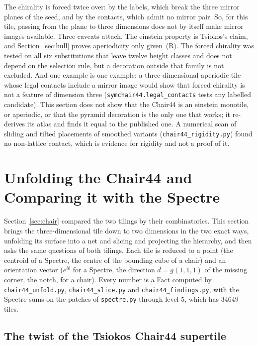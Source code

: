 \documentclass[11pt]{article}
\theoremstyle{definition}
\theoremstyle{remark}
\newcommand{\code}[1]{\texttt{#1}}
\begin{document}
\noindent
The chirality is forced twice over: by the labels, which break the three mirror planes of the seed, and by the contacts, which
admit no mirror pair.  So, for this tile, passing from the plane to three dimensions does not by itself make mirror images
available.  Three caveats attach.  The einstein property is Tsiokos's claim, and Section~\ref{sec:hull} proves aperiodicity only
given~(R).  The forced chirality was tested on
all six substitutions that leave twelve height classes and does not depend on the selection rule, but a decoration outside that
family is not excluded.  And one example is one example: a three-dimensional aperiodic tile whose legal contacts include a mirror
image would show that forced chirality is not a feature of dimension three (\code{symchair44.legal\_contacts} tests any labelled
candidate).  This section does not show that the Chair44 is an einstein monotile, or aperiodic, or that the pyramid decoration
is the only one that works; it re-derives its atlas and finds it equal to the published one.  A numerical scan of sliding and
tilted placements of smoothed variants (\code{chair44\_rigidity.py}) found no non-lattice contact, which is evidence for rigidity
and not a proof of it.


\section{Unfolding the Chair44 and Comparing it with the Spectre}
\label{sec:unfold}

Section~\ref{sec:chair} compared the two tilings by their combinatorics.  This section brings the three-dimensional tile down
to two dimensions in the two exact ways, unfolding its surface into a net and slicing and projecting the hierarchy, and then
asks the same questions of both tilings.  Each tile is reduced to a point (the centroid of a Spectre, the centre of the bounding
cube of a chair) and an orientation vector ($e^{i\theta}$ for a Spectre, the direction $d=g(1,1,1)$ of the missing corner, the
notch, for a chair).  Every number is a Fact computed by \code{chair44\_unfold.py}, \code{chair44\_slice.py} and
\code{chair44\_findings.py}, with the Spectre sums on the patches of \code{spectre.py} through level $5$, which has $34649$ tiles.

\subsection{The twist of the Tsiokos Chair44 supertile}
\end{document}

